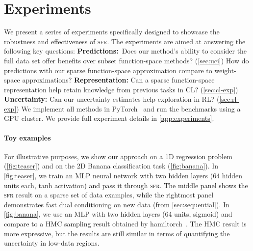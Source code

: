 \documentclass{article} %
\newcommand{\our}{\textsc{sfr}\xspace}
\begin{document}
\section{Experiments}
\label{sec:experiments}
%
We present a series of experiments specifically designed to showcase the robustness and effectiveness of \our. The experiments are aimed at answering the following key questions:
\textbf{Predictions:}~Does our method's ability to consider the full data set offer benefits over subset function-space methods? (\cref{sec:uci}) How do predictions with our sparse function-space approximation compare to weight-space approximations?
\textbf{Representation:} Can a sparse function-space representation help retain knowledge from previous tasks in CL? (\cref{sec:cl-exp})
\textbf{Uncertainty:} Can our uncertainty estimates help exploration in RL? (\cref{sec:rl-exp}) We implement all methods in PyTorch~\cite{paszke2019pytorch} and run the benchmarks using a GPU cluster. We provide full experiment details in \cref{app:experiments}.

\paragraph{Toy examples} For illustrative purposes, we show our approach on a 1D regression problem (\cref{fig:teaser}) and on the 2D {\sc Banana} classification task (\cref{fig:banana}). In \cref{fig:teaser}, we train an MLP neural network with two hidden layers (64 hidden units each, tanh activation) and pass it through \our. The middle panel shows the \our result on a sparse set of data examples, while the rightmost panel demonstrates fast dual conditioning on new data (from \cref{sec:sequential}). In \cref{fig:banana}, we use an MLP with two hidden layers (64 units, sigmoid) and compare to a HMC sampling result obtained by hamiltorch~\cite{cobb2020scaling}. The HMC result is more expressive, but the results are still similar in terms of quantifying the uncertainty in low-data regions.


\end{document}
